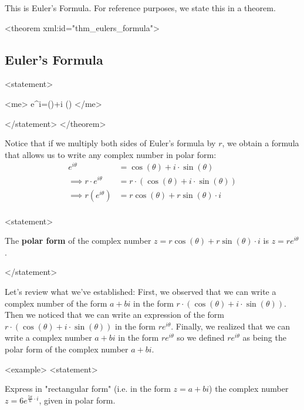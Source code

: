     
      This is Euler's Formula. For reference purposes, we state this in a theorem.
    
    <theorem xml:id="thm_eulers_formula">
      \subsection*{Euler's Formula}
        <statement>
          
            <me>
              e^{i\theta}=\cos(\theta)+i \cdot \sin(\theta)
            </me>
          
        </statement>
    </theorem>
    
      Notice that if we multiply both sides of Euler's formula by $r$, we obtain a formula that allows us to write any complex number in polar form:
      \begin{align*}
        e^{i\theta} &=\cos(\theta)+i \cdot \sin(\theta)\\
        \implies r \cdot e^{i\theta} &= r \cdot \left( \cos \left( \theta \right)+i\cdot\sin \left( \theta \right)\right)\\
        \implies r(e^{i\theta}) &=r\cos(\theta)+r\sin(\theta) \cdot i\\
      \end{align*}
    
    \begin{myDefinition}
      <statement>
        
          The \textbf{polar form} of the complex number $z=r\cos(\theta)+r\sin(\theta)\cdot i$ is $z=re^{i\theta}$.
        
      </statement>
    \end{myDefinition}
    
      Let's review what we've established: First, we observed that we can write a complex number of the form $a+bi$ in the form $r \cdot \left( \cos \left( \theta \right)+i\cdot\sin \left( \theta \right)\right)$. Then we noticed that we can write an expression of the form $r \cdot \left( \cos \left( \theta \right)+i\cdot\sin \left( \theta \right)\right)$ in the form $re^{i\theta}$. Finally, we realized that we can write a complex number $a+bi$ in the form $re^{i\theta}$ so we defined $re^{i\theta}$ as being the polar form of the complex number $a+bi$.
    
    <example>
      <statement>
        
          Express in "rectangular form" (i.e. in the form $z=a+bi$) the complex number $z=6e^{\frac{5\pi}{6}\cdot i}$, given in polar form.
        

